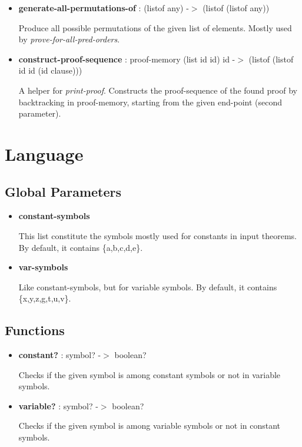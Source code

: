 \documentclass[11pt]{report}
\begin{document}
\begin{appendices}
\begin{itemize}
 \item \textbf{generate-all-permutations-of} : (listof any) -$>$ (listof (listof any))

Produce all possible permutations of the given list of elements. Mostly used by \textit{prove-for-all-pred-orders}.

 \item \textbf{construct-proof-sequence} : proof-memory (list id id) id -$>$ (listof (listof id id (id clause)))

A helper for \textit{print-proof}. Constructs the proof-sequence of the found proof by backtracking in proof-memory, starting from the given end-point (second parameter).

\end{itemize}

\section{Language}

\subsection{Global Parameters}

\begin{itemize}
 \item \textbf{constant-symbols}

This list constitute the symbols mostly used for constants in input theorems. By default, it contains \{a,b,c,d,e\}.

 \item \textbf{var-symbols}

Like constant-symbols, but for variable symbols. By default, it contains \{x,y,z,g,t,u,v\}.
\end{itemize}

\subsection{Functions}

\begin{itemize}
 \item \textbf{constant?} : symbol? -$>$ boolean?

Checks if the given symbol is among constant symbols or not in variable symbols.

 \item \textbf{variable?} : symbol? -$>$ boolean?

Checks if the given symbol is among variable symbols or not in constant symbols.


\end{itemize}
\end{appendices}
\end{document}
